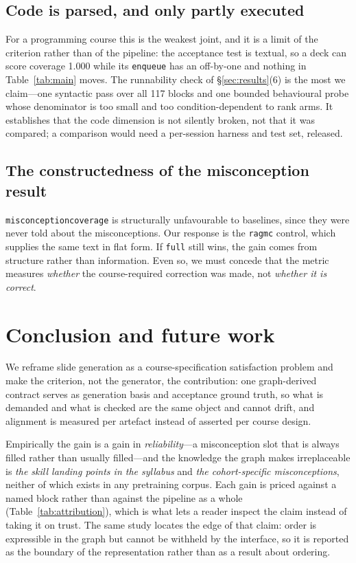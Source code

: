 \documentclass[review,12pt]{elsarticle}
\renewcommand{\_}{\kgunderscore\allowbreak}
\newcommand{\id}[1]{\texttt{#1}}
\begin{document}
\subsection{Code is parsed, and only partly executed}
\label{sec:code}

For a programming course this is the weakest joint, and it is a limit of the
criterion rather than of the pipeline: the acceptance test is textual, so a deck
can score coverage 1.000 while its \id{enqueue} has an off-by-one and nothing in
Table~\ref{tab:main} moves. The runnability check of \S\ref{sec:results}(6) is
the most we claim---one syntactic pass over all 117 blocks and one bounded
behavioural probe whose denominator is too small and too condition-dependent to
rank arms. It establishes that the code dimension is not silently broken, not
that it was compared; a comparison would need a per-session harness and test set,
released.

\subsection{The constructedness of the misconception result}

\id{misconception\_coverage} is structurally unfavourable to baselines, since
they were never told about the misconceptions. Our response is the \id{rag\_mc}
control, which supplies the same text in flat form. If \id{full} still wins, the
gain comes from structure rather than information. Even so, we must concede that
the metric measures \emph{whether} the course-required correction was made, not
\emph{whether it is correct}.

\section{Conclusion and future work}

We reframe slide generation as a course-specification satisfaction
problem and make the criterion, not the generator, the contribution: one
graph-derived contract serves as generation basis and acceptance ground truth, so
what is demanded and what is checked are the same object and cannot drift, and
alignment is measured per artefact instead of asserted per course design.

Empirically the gain is a gain in \emph{reliability}---a misconception slot that is
always filled rather than usually filled---and the knowledge the graph makes
irreplaceable is \emph{the skill landing points in the syllabus} and \emph{the
cohort-specific misconceptions}, neither of which exists in any pretraining corpus.
Each gain is priced against a named block rather than against the pipeline as a
whole (Table~\ref{tab:attribution}), which is what lets a reader inspect the claim
instead of taking it on trust. The same study locates the edge of that claim:
order is expressible in the graph but cannot be withheld by the interface, so it is
reported as the boundary of the representation rather than as a result about
ordering.
\end{document}
